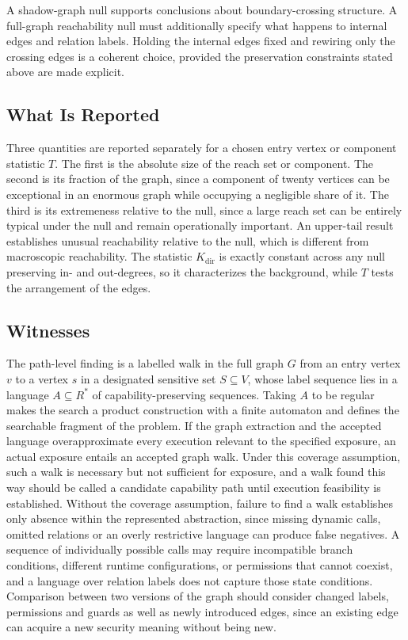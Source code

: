 \documentclass[11pt]{article}
\begin{document}
A shadow-graph null supports conclusions about boundary-crossing structure. A full-graph reachability null must additionally specify what happens to internal edges and relation labels. Holding the internal edges fixed and rewiring only the crossing edges is a coherent choice, provided the preservation constraints stated above are made explicit.

\subsection{What Is Reported}

Three quantities are reported separately for a chosen entry vertex or component statistic $T$. The first is the absolute size of the reach set or component. The second is its fraction of the graph, since a component of twenty vertices can be exceptional in an enormous graph while occupying a negligible share of it. The third is its extremeness relative to the null, since a large reach set can be entirely typical under the null and remain operationally important. An upper-tail result establishes unusual reachability relative to the null, which is different from macroscopic reachability. The statistic $K_{\mathrm{dir}}$ is exactly constant across any null preserving in- and out-degrees, so it characterizes the background, while $T$ tests the arrangement of the edges.

\subsection{Witnesses}

The path-level finding is a labelled walk in the full graph $G$ from an entry vertex $v$ to a vertex $s$ in a designated sensitive set $S\subseteq V$, whose label sequence lies in a language $A\subseteq R^{*}$ of capability-preserving sequences. Taking $A$ to be regular makes the search a product construction with a finite automaton and defines the searchable fragment of the problem. If the graph extraction and the accepted language overapproximate every execution relevant to the specified exposure, an actual exposure entails an accepted graph walk. Under this coverage assumption, such a walk is necessary but not sufficient for exposure, and a walk found this way should be called a candidate capability path until execution feasibility is established. Without the coverage assumption, failure to find a walk establishes only absence within the represented abstraction, since missing dynamic calls, omitted relations or an overly restrictive language can produce false negatives. A sequence of individually possible calls may require incompatible branch conditions, different runtime configurations, or permissions that cannot coexist, and a language over relation labels does not capture those state conditions. Comparison between two versions of the graph should consider changed labels, permissions and guards as well as newly introduced edges, since an existing edge can acquire a new security meaning without being new.
\end{document}
